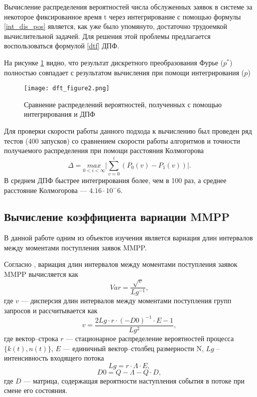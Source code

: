Вычисление распределения вероятностей числа обслуженных заявок в системе за некоторое фиксированное время t через интегрирование с помощью формулы \eqref{int_dis_pos} является, как уже было упомянуто, достаточно трудоемкой вычислительной задачей. Для решения этой проблемы предлагается воспользоваться формулой \eqref{dtf} ДПФ.

На рисунке \ref{dft_figure2z} видно, что результат дискретного преобразования Фурье ($p^*$) полностью совпадает с результатом вычисления при помощи интегрирования ($p$)
\begin{figure}[H]
	\centering
	\texttt{[image: dft\_figure2.png]}
	\caption{Сравнение распределений вероятностей, полученных с помощью интегрирования и ДПФ}
	\label{dft_figure2z}
\end{figure}

Для проверки скорости работы данного подхода к вычислению был проведен ряд тестов (400 запусков) со сравнением скорости работы алгоритмов и точности получаемого распределения при помощи расстояния Колмогорова
\begin{equation*}
	\Delta = \underset{0 < i < \infty}{max}\bigg\rvert \sum_{v=0}^{i} (P_0(v) - P_1(v))\bigg\rvert.
\end{equation*}
В среднем ДПФ быстрее интегрирования более, чем в 100 раз, а среднее расстояние Колмогорова --- $4.16 \cdot 10^-6$.

\subsection{Вычисление коэффициента вариации MMPP}
В данной работе одним из объектов изучения является вариация длин интервалов между моментами поступления заявок MMPP.

Согласно \cite{вишневский2018стохастические}, вариация длин интервалов между моментами поступления заявок MMPP вычисляется как
\begin{equation}
	Var = \frac{\sqrt{v}}{Lg^{-1}},
\end{equation}
где $v$ --- дисперсия длин интервалов между моментами поступления групп запросов и рассчитывается как
\begin{equation}
	v = \frac{2Lg\cdot r \cdot (-D0)^{-1} \cdot E -1}{Lg^2},
\end{equation}
где вектор--строка $r$ --- стационарное распределение вероятностей процесса\\$\{k(t),n(t)\}$, $E$ --- единичный вектор--столбец размерности N, $Lg$ -- интенсивность входящего потока
\begin{equation} \label{eq_lg}
	Lg = r\cdot \Lambda \cdot E,
\end{equation}
\begin{equation*}
	D0 = Q - \Lambda - Q\cdot D,
\end{equation*}
где $D$ --- матрица, содержащая вероятности наступления события в потоке при смене его состояния.
\clearpage
